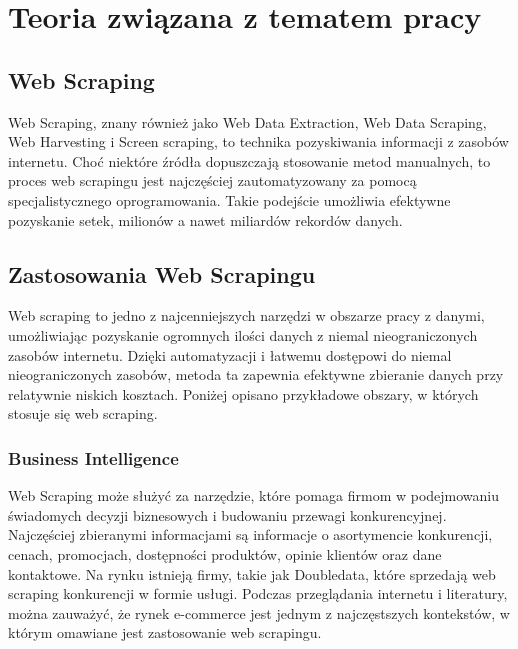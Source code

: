 \newpage

\section{Teoria związana z tematem pracy}\label{sec:teoria}

\subsection{Web Scraping}\label{subsec:web-scraping}

Web Scraping, znany również jako Web Data Extraction, Web Data Scraping, Web Harvesting i Screen scraping, to technika pozyskiwania informacji z zasobów internetu\cite{Zhao2017}.
Choć niektóre źródła dopuszczają stosowanie metod manualnych\cite{applications-and-tools}, to proces web scrapingu jest najczęściej zautomatyzowany za pomocą specjalistycznego oprogramowania.
Takie podejście umożliwia efektywne pozyskanie setek, milionów a nawet miliardów rekordów danych.

\subsection{Zastosowania Web Scrapingu}\label{subsec:web-scraping-applications}

Web scraping to jedno z najcenniejszych narzędzi w obszarze pracy z danymi, umożliwiając pozyskanie ogromnych ilości danych z niemal nieograniczonych zasobów internetu\cite{Zhao2017}.
Dzięki automatyzacji i łatwemu dostępowi do niemal nieograniczonych zasobów, metoda ta zapewnia efektywne zbieranie danych przy relatywnie niskich kosztach.
Poniżej opisano przykładowe obszary, w których stosuje się web scraping.

\subsubsection{Business Intelligence}
Web Scraping może służyć za narzędzie, które pomaga firmom w podejmowaniu świadomych decyzji biznesowych i budowaniu przewagi konkurencyjnej.
Najczęściej zbieranymi informacjami są informacje o asortymencie konkurencji, cenach, promocjach, dostępności produktów, opinie klientów oraz dane kontaktowe.
Na rynku istnieją firmy, takie jak Doubledata\cite{doubledata}, które sprzedają web scraping konkurencji w formie usługi.
Podczas przeglądania internetu i literatury, można zauważyć, że rynek e-commerce jest jednym z najczęstszych kontekstów, w którym omawiane jest zastosowanie web scrapingu.

